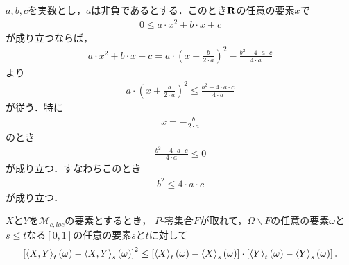 	$a,b,c$を実数とし，$a$は非負であるとする．このとき$\mathbf{R}$の任意の要素$x$で
	\begin{align}
		0 \leq a \cdot x^{2} + b \cdot x + c
	\end{align}
	が成り立つならば，
	\begin{align}
		a \cdot x^{2} + b \cdot x + c
		= a \cdot \left(x+\frac{b}{2 \cdot a}\right)^{2} - \frac{b^{2} - 4 \cdot a \cdot c}{4 \cdot a}
	\end{align}
	より
	\begin{align}
		a \cdot \left(x+\frac{b}{2 \cdot a}\right)^{2} 
		\leq \frac{b^{2} - 4 \cdot a \cdot c}{4 \cdot a}
	\end{align}
	が従う．特に
	\begin{align}
		x = -\frac{b}{2 \cdot a}
	\end{align}
	のとき
	\begin{align}
		 \frac{b^{2} - 4 \cdot a \cdot c}{4 \cdot a} \leq 0
	\end{align}
	が成り立つ．すなわちこのとき
	\begin{align}
		b^{2} \leq 4 \cdot a \cdot c
	\end{align}
	が成り立つ．
	
	\begin{screen}
		\begin{thm}[二次変分に対するSchwartzの不等式]
			$X$と$Y$を$\mathscr{M}_{c,loc}$の要素とするとき，
			$P$-零集合$F$が取れて，$\Omega \backslash F$の任意の要素$\omega$と
			$s \leq t$なる$[0,1]$の任意の要素$s$と$t$に対して
			\begin{align}
				\left[\inprod<X,Y>_{t}(\omega) - \inprod<X,Y>_{s}(\omega)\right]^{2}
				\leq \left[\inprod<X>_{t}(\omega) - \inprod<X>_{s}(\omega)\right] 
				\cdot \left[\inprod<Y>_{t}(\omega) - \inprod<Y>_{s}(\omega)\right].
			\end{align}
		\end{thm}
	\end{screen}
	
